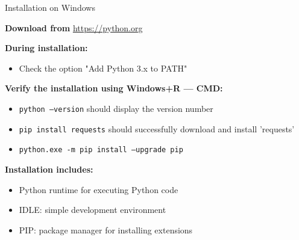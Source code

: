 \documentclass[
	11pt, 
]{beamer}
\begin{document}
\begin{frame}{Installation on Windows}

    \textbf{Download from} \url{https://python.org} \smallskip
    
    \textbf{During installation:}
    \begin{itemize}
        \item Check the option "Add Python 3.x to PATH"
    \end{itemize} \smallskip

    \textbf{Verify the installation using Windows+R ---  CMD:}
    \begin{itemize}
        \item \texttt{python --version} should display the version number
        \item \texttt{pip install requests} should successfully download and install 'requests'
        \item \texttt{python.exe -m pip install --upgrade pip}
    \end{itemize} \smallskip

    \textbf{Installation includes:}
    \begin{itemize}
        \item Python runtime for executing Python code
        \item IDLE: simple development environment
        \item PIP: package manager for installing extensions
    \end{itemize}
\end{frame}

\end{document}
